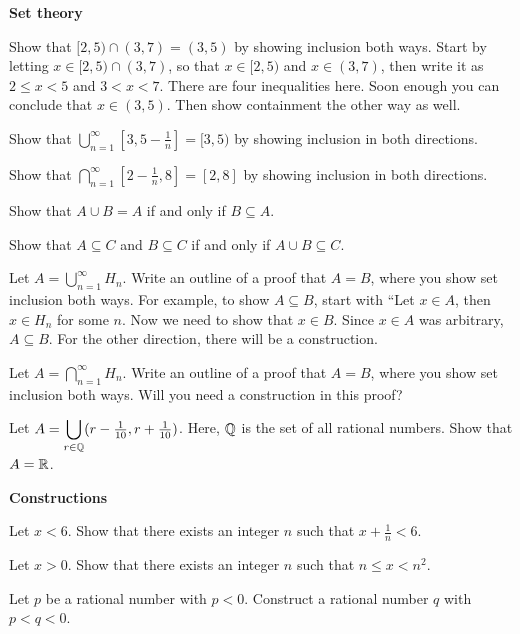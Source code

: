 \pagebreak

\noindent
{\bf Set theory}
\blist{0.2in}
\item Show that $[2,5) \cap (3,7) = (3,5)$ by showing inclusion both ways.
Start by letting $x \in [2,5) \cap (3,7)$, so that $x \in [2,5)$ and $x \in (3,7)$, then write it as $2 \leq x < 5$ and $3 < x < 7$.
There are four inequalities here.  Soon enough you can conclude that $x \in (3,5)$.
Then show containment the other way as well.

\item Show that $\bigcup_{n=1}^{\infty} [3,5-\frac{1}{n}] = [3,5)$ by showing inclusion in both directions.

\item Show that $\bigcap_{n=1}^{\infty} [2-\frac{1}{n},8] = [2,8]$ by showing inclusion in both directions.

\item Show that $A \cup B = A$ if and only if $B \subseteq A$.

\item Show that $A \subseteq C$ and $B \subseteq C$ if and only if $A \cup B \subseteq C$.

\item Let $A = \bigcup_{n=1}^{\infty} H_n$.  Write an outline of a proof that $A = B$, where you show set inclusion both ways.
For example, to show $A \subseteq B$, start with ``Let $x \in A$, then $x \in H_n$ for some $n$.  Now we need to show that $x \in B$.  Since $x \in A$ was arbitrary, $A \subseteq B$.
For the other direction, there will be a construction.

\item Let $A = \bigcap_{n=1}^{\infty} H_n$.  Write an outline of a proof that $A = B$, where you show set inclusion both ways.
Will you need a construction in this proof?

\item Let ${\displaystyle A = \bigcup_{r \in \mathbb{Q}}} (r-\frac{1}{10}, r+\frac{1}{10})$.
Here, $\mathbb{Q}$ is the set of all rational numbers.
Show that $A = \mathbb{R}$.

\elist

\noindent
{\bf Constructions}
\blist{0.2in}
\item Let $x < 6$.
Show that there exists an integer $n$ such that $x + \frac{1}{n} < 6$.

\item Let $x > 0$.
Show that there exists an integer $n$ such that $n \leq x < n^2$.

\item Let $p$ be a rational number with $p < 0$.
Construct a rational number $q$ with $p < q < 0$.

